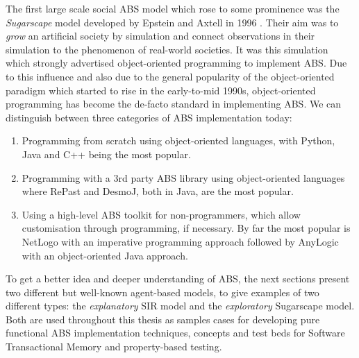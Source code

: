 The first large scale social ABS model which rose to some prominence was the \textit{Sugarscape} model developed by Epstein and Axtell in 1996 \cite{epstein_growing_1996}. Their aim was to \textit{grow} an artificial society by simulation and connect observations in their simulation to the phenomenon of real-world societies. It was this simulation which strongly advertised object-oriented programming to implement ABS. Due to this influence and also due to the general popularity of the object-oriented paradigm which started to rise in the early-to-mid 1990s, object-oriented programming has become the de-facto standard in implementing ABS. We can distinguish between three categories of ABS implementation today: %
\begin{enumerate}
	\item Programming from scratch using object-oriented languages, with Python, Java and C++ being the most popular.
	\item Programming with a 3rd party ABS library using object-oriented languages where RePast and DesmoJ, both in Java, are the most popular.
	\item Using a high-level ABS toolkit for non-programmers, which allow customisation through programming, if necessary. By far the most popular is NetLogo with an imperative programming approach followed by AnyLogic with an object-oriented Java approach.
\end{enumerate}

To get a better idea and deeper understanding of ABS, the next sections present two different but well-known agent-based models, to give examples of two different types: the \textit{explanatory} SIR model and the \textit{exploratory} Sugarscape model. Both are used throughout this thesis as samples cases for developing pure functional ABS implementation techniques, concepts and test beds for Software Transactional Memory and property-based testing.




